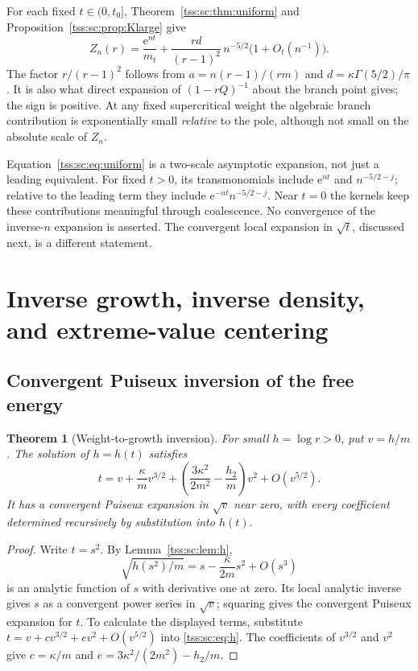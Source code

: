 \documentclass[11pt]{article}
\newtheorem{theorem}{Theorem}[section]
\theoremstyle{remark}\newtheorem{remark}[theorem]{Remark}
\theoremstyle{definition}\newtheorem{definition}[theorem]{Definition}
\newcommand{\e}{\mathrm e}
\begin{document}
For each fixed $t\in(0,t_0]$, Theorem~\ref{tss:sc:thm:uniform} and Proposition~\ref{tss:sc:prop:Klarge} give
\begin{equation}\label{tss:sc:eq:fixedsuper}
 Z_n(r)=\frac{\e^{nt}}{m_t}
       +\frac{r d}{(r-1)^2}\,n^{-5/2}\bigl(1+O_t(n^{-1})\bigr).
\end{equation}
The factor $r/(r-1)^2$ follows from $a=n(r-1)/(rm)$ and $d=\kappa\Gamma(5/2)/\pi$. It is also what direct expansion of $(1-rQ)^{-1}$ about the branch point gives; the sign is positive. At any fixed supercritical weight the algebraic branch contribution is exponentially small \emph{relative} to the pole, although not small on the absolute scale of $Z_n$.

Equation~\eqref{tss:sc:eq:uniform} is a two-scale asymptotic expansion, not just a leading equivalent. For fixed $t>0$, its transmonomials include $\e^{nt}$ and $n^{-5/2-j}$; relative to the leading term they include $\e^{-nt}n^{-5/2-j}$. Near $t=0$ the kernels keep these contributions meaningful through coalescence. No convergence of the inverse-$n$ expansion is asserted. The convergent local expansion in $\sqrt t$, discussed next, is a different statement.

\section{Inverse growth, inverse density, and extreme-value centering}
\label{tss:sc:sec:inverse}

\subsection{Convergent Puiseux inversion of the free energy}
\begin{theorem}[Weight-to-growth inversion]\label{tss:sc:thm:inverse}
For small $h=\log r>0$, put $v=h/m$. The solution of $h=h(t)$ satisfies
\begin{equation}\label{tss:sc:eq:inverse}
 \boxed{\displaystyle
 t=v+\frac{\kappa}{m}v^{3/2}
 +\left(\frac{3\kappa^2}{2m^2}-\frac{h_2}{m}\right)v^2
 +O(v^{5/2}).}
\end{equation}
It has a convergent Puiseux expansion in $\sqrt v$ near zero, with every coefficient determined recursively by substitution into $h(t)$.
\end{theorem}
\begin{proof}
Write $t=s^2$. By Lemma~\ref{tss:sc:lem:h},
\[
 \sqrt{h(s^2)/m}=s-\frac{\kappa}{2m}s^2+O(s^3)
\]
is an analytic function of $s$ with derivative one at zero. Its local analytic inverse gives $s$ as a convergent power series in $\sqrt v$; squaring gives the convergent Puiseux expansion for $t$. To calculate the displayed terms, substitute
$t=v+c v^{3/2}+e v^2+O(v^{5/2})$ into \eqref{tss:sc:eq:h}. The coefficients of $v^{3/2}$ and $v^2$ give $c=\kappa/m$ and $e=3\kappa^2/(2m^2)-h_2/m$.
\end{proof}
\end{document}
